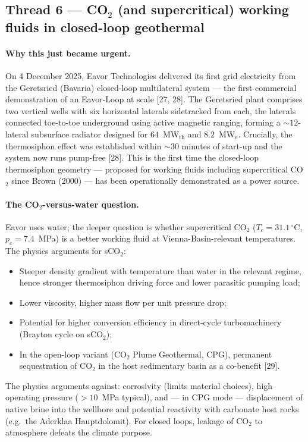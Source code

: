 \documentclass{article}
\begin{document}
\subsection*{Thread 6 --- CO$_2$ (and supercritical) working fluids in closed-loop geothermal}

\paragraph{Why this just became urgent.}
On 4 December 2025, Eavor Technologies delivered its first grid
electricity from the Geretsried (Bavaria) closed-loop multilateral
system --- the first commercial demonstration of an Eavor-Loop at scale
[27, 28]. The Geretsried plant comprises two vertical wells with six
horizontal laterals sidetracked from each, the laterals connected
toe-to-toe underground using active magnetic ranging, forming a
$\sim 12$-lateral subsurface radiator designed for $64$~MW$_{\mathrm{th}}$
and $8.2$~MW$_{\mathrm{e}}$. Crucially, the thermosiphon effect was
established within $\sim 30$ minutes of start-up and the system now
runs pump-free [28]. This is the first time the closed-loop thermosiphon
geometry --- proposed for working fluids including supercritical
CO$_2$ since Brown (2000) --- has been operationally demonstrated as
a power source.

\paragraph{The CO$_2$-versus-water question.}
Eavor uses water; the deeper question is whether supercritical CO$_2$
($T_c = 31.1\,^\circ$C, $p_c = 7.4$~MPa) is a better working fluid at
Vienna-Basin-relevant temperatures. The physics arguments for sCO$_2$:
\begin{itemize}
\item Steeper density gradient with temperature than water in the
relevant regime, hence stronger thermosiphon driving force and lower
parasitic pumping load;
\item Lower viscosity, higher mass flow per unit pressure drop;
\item Potential for higher conversion efficiency in direct-cycle
turbomachinery (Brayton cycle on sCO$_2$);
\item In the open-loop variant (CO$_2$ Plume Geothermal, CPG), permanent
sequestration of CO$_2$ in the host sedimentary basin as a co-benefit [29].
\end{itemize}
The physics arguments against: corrosivity (limits material choices),
high operating pressure ($> 10$~MPa typical), and --- in CPG mode ---
displacement of native brine into the wellbore and potential reactivity
with carbonate host rocks (e.g.\ the Aderklaa Hauptdolomit). For closed
loops, leakage of CO$_2$ to atmosphere defeats the climate purpose.
\end{document}
